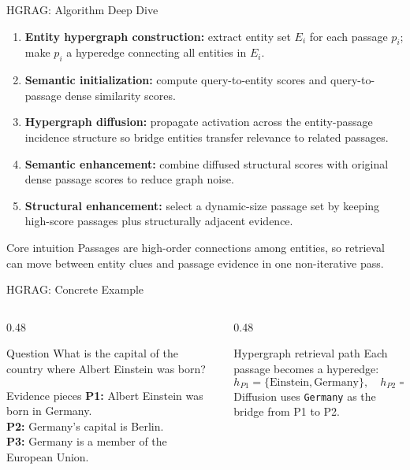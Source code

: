 
\begin{frame}{HGRAG: Algorithm Deep Dive}
\scriptsize
\begin{enumerate}
  \item \textbf{Entity hypergraph construction:} extract entity set $E_i$ for each passage $p_i$; make $p_i$ a hyperedge connecting all entities in $E_i$.
  \item \textbf{Semantic initialization:} compute query-to-entity scores and query-to-passage dense similarity scores.
  \item \textbf{Hypergraph diffusion:} propagate activation across the entity-passage incidence structure so bridge entities transfer relevance to related passages.
  \item \textbf{Semantic enhancement:} combine diffused structural scores with original dense passage scores to reduce graph noise.
  \item \textbf{Structural enhancement:} select a dynamic-size passage set by keeping high-score passages plus structurally adjacent evidence.
\end{enumerate}
\begin{block}{Core intuition}
Passages are high-order connections among entities, so retrieval can move between entity clues and passage evidence in one non-iterative pass.
\end{block}
\end{frame}

\begin{frame}{HGRAG: Concrete Example}
\scriptsize
\begin{columns}[T,onlytextwidth]
  \begin{column}{0.48\textwidth}
    \begin{block}{Question}
      What is the capital of the country where Albert Einstein was born?
    \end{block}
    \begin{block}{Evidence pieces}
      \textbf{P1:} Albert Einstein was born in Germany.\\
      \textbf{P2:} Germany's capital is Berlin.\\
      \textbf{P3:} Germany is a member of the European Union.
    \end{block}
  \end{column}
  \begin{column}{0.48\textwidth}
    \begin{block}{Hypergraph retrieval path}
      Each passage becomes a hyperedge:
      \[
      h_{P1}=\{\text{Einstein}, \text{Germany}\},\quad
      h_{P2}=\{\text{Germany}, \text{Berlin}\}
      \]
      Diffusion uses \texttt{Germany} as the bridge from P1 to P2.
    \end{block}
  \end{column}
\end{columns}
\end{frame}

